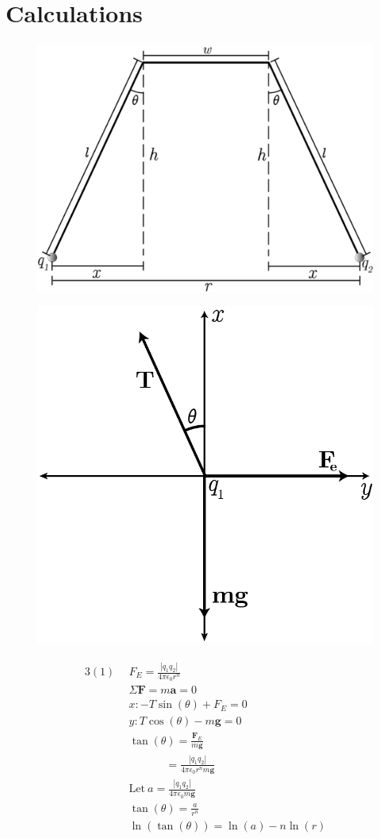 \documentclass[12pt]{article}
\begin{document}
    \section{Calculations}
        \begin{figure}[H]
            \centering
            \includegraphics[width=0.75\linewidth]{diagram.png}
        \end{figure}
        \begin{figure}[H]
            \centering
            \includegraphics[width=0.7\linewidth]{freebody.png}
        \end{figure}
        \begin{alignat*}{3}
            (1)~~
            &F_E = \frac{|q_1q_2|}{4\pi \epsilon_0 r^n}\\
            &\Sigma \mathbf{F} = m\mathbf{a} = 0\\
            &x: -T\sin(\theta) + F_E = 0\\
            &y: T\cos(\theta) - m\mathbf{g} = 0\\
            &\tan(\theta) = \frac{\mathbf{F}_E}{m\mathbf{g}}\\
            &\qquad\quad\;\!\! = \frac{|q_1q_2|}{4\pi \epsilon_0 r^nm\mathbf{g}}\\
            &\text{Let}\ a = \frac{|q_1q_2|}{4\pi \epsilon_0 m\mathbf{g}}\\
            &\tan(\theta) = \frac{a}{r^n}\\
            &\ln(\tan(\theta)) = \ln(a) - n\ln(r)\\            
        \end{alignat*}
\end{document}
